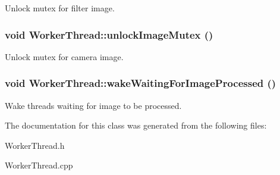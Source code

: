 Unlock mutex for filter image. \hypertarget{classWorkerThread_46021367ce9eab463d36a150ee2a109e}{
\subsubsection[{unlockImageMutex}]{\setlength{\rightskip}{0pt plus 5cm}void WorkerThread::unlockImageMutex ()}}
\label{classWorkerThread_46021367ce9eab463d36a150ee2a109e}


Unlock mutex for camera image. \hypertarget{classWorkerThread_72e14fd4cfb0ff06088ed568fbbc4658}{
\subsubsection[{wakeWaitingForImageProcessed}]{\setlength{\rightskip}{0pt plus 5cm}void WorkerThread::wakeWaitingForImageProcessed ()}}
\label{classWorkerThread_72e14fd4cfb0ff06088ed568fbbc4658}


Wake threads waiting for image to be processed. 

The documentation for this class was generated from the following files:\begin{CompactItemize}
\item 
WorkerThread.h\item 
WorkerThread.cpp\end{CompactItemize}
